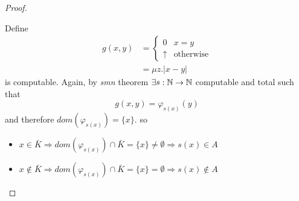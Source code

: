 \begin{observation}
\begin{proof}
\begin{enumerate}
      Define
      \begin{align*}
        g(x,y) &= \begin{cases}
          0        & x=y \\
          \uparrow & \mbox{otherwise}
        \end{cases} \\
        &= \mu z . |x-y|
      \end{align*}
      is computable. Again,
      by \emph{smn} theorem $\exists s : \mathbb{N} \to \mathbb{N}$ computable and total
      such that
      \[
        g(x,y) = \varphi_{s(x)}(y)
      \]
      and therefore $dom(\varphi_{s(x)}) = \{x\}$. so
      \begin{itemize}
      \item
        \(x \in \bar{K} \Rightarrow dom(\varphi_{s(x)}) \cap \bar{K} =
        \{x\} \neq \emptyset \Rightarrow s(x) \in A\)
      \item
        \(x \notin \bar{K} \Rightarrow dom(\varphi_{s(x)}) \cap \bar{K}
        = \{x\} = \emptyset \Rightarrow s(x) \notin A\)
      \end{itemize}
    \end{enumerate}
  \end{proof}
\end{observation}
